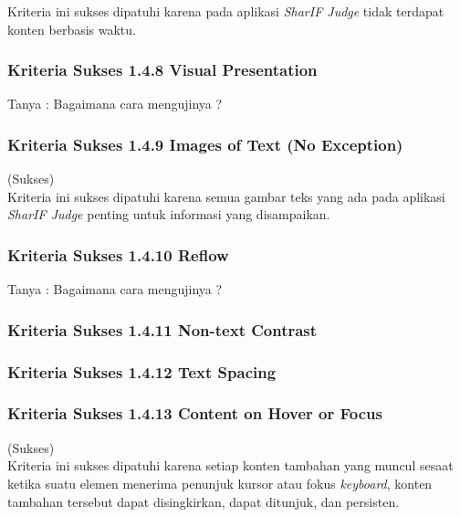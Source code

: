 Kriteria ini sukses dipatuhi karena pada aplikasi \textit{SharIF Judge} tidak terdapat konten berbasis waktu.


\subsubsection{Kriteria Sukses 1.4.8 Visual Presentation}
\label{subsubsec:kepatuhan_kriteria_1.4.8}

Tanya : Bagaimana cara mengujinya ?

\subsubsection{Kriteria Sukses 1.4.9 Images of Text (No Exception)}
\label{subsubsec:kepatuhan_kriteria_1.4.9}
(Sukses) \\

Kriteria ini sukses dipatuhi karena semua gambar teks yang ada pada aplikasi \textit{SharIF Judge} penting untuk informasi yang disampaikan.

\subsubsection{Kriteria Sukses 1.4.10 Reflow}
\label{subsubsec:kepatuhan_kriteria_1.4.10}

Tanya : Bagaimana cara mengujinya ?

\subsubsection{Kriteria Sukses 1.4.11 Non-text Contrast}
\label{subsubsec:kepatuhan_kriteria_1.4.11}

\subsubsection{Kriteria Sukses 1.4.12 Text Spacing}
\label{subsubsec:kepatuhan_kriteria_1.4.12}

\subsubsection{Kriteria Sukses 1.4.13 Content on Hover or Focus}
\label{subsubsec:kepatuhan_kriteria_1.4.13}
(Sukses) \\

Kriteria ini sukses dipatuhi karena setiap konten tambahan yang muncul sesaat ketika suatu elemen menerima penunjuk kursor atau fokus \textit{keyboard}, konten tambahan tersebut dapat disingkirkan, dapat ditunjuk, dan persisten.

